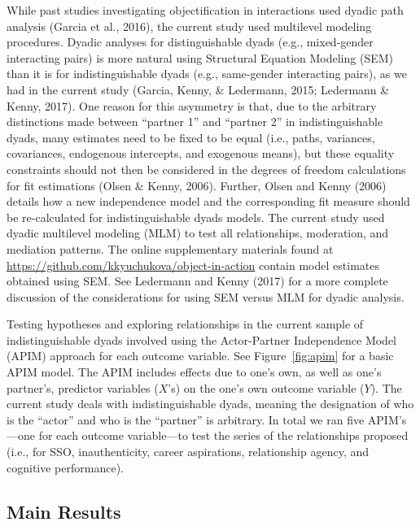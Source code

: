 \documentclass[man]{apa6}
\begin{document}
While past studies investigating objectification in interactions used
dyadic path analysis (Garcia et al., 2016), the current study used
multilevel modeling procedures. Dyadic analyses for distinguishable
dyads (e.g., mixed-gender interacting pairs) is more natural using
Structural Equation Modeling (SEM) than it is for indistinguishable
dyads (e.g., same-gender interacting pairs), as we had in the current
study (Garcia, Kenny, \& Ledermann, 2015; Ledermann \& Kenny, 2017). One
reason for this asymmetry is that, due to the arbitrary distinctions
made between \enquote{partner 1} and \enquote{partner 2} in
indistinguishable dyads, many estimates need to be fixed to be equal
(i.e., paths, variances, covariances, endogenous intercepts, and
exogenous means), but these equality constraints should not then be
considered in the degrees of freedom calculations for fit estimations
(Olsen \& Kenny, 2006). Further, Olsen and Kenny (2006) details how a
new independence model and the corresponding fit measure should be
re-calculated for indistinguishable dyads models. The current study used
dyadic multilevel modeling (MLM) to test all relationships, moderation,
and mediation patterns. The online supplementary materials found at
\url{https://github.com/kkyuchukova/object-in-action} contain model
estimates obtained using SEM. See Ledermann and Kenny (2017) for a more
complete discussion of the considerations for using SEM versus MLM for
dyadic analysis.

Testing hypotheses and exploring relationships in the current sample of
indistinguishable dyads involved using the Actor-Partner Independence
Model (APIM) approach for each outcome variable. See
Figure~\ref{fig:apim} for a basic APIM model. The APIM includes effects
due to one's own, as well as one's partner's, predictor variables
(\(X\)'s) on the one's own outcome variable (\(Y\)). The current study
deals with indistinguishable dyads, meaning the designation of who is
the \enquote{actor} and who is the \enquote{partner} is arbitrary. In
total we ran five APIM's---one for each outcome variable---to test the
series of the relationships proposed (i.e., for SSO, inauthenticity,
career aspirations, relationship agency, and cognitive performance).

\subsection{Main Results}\label{main-results}
\end{document}
